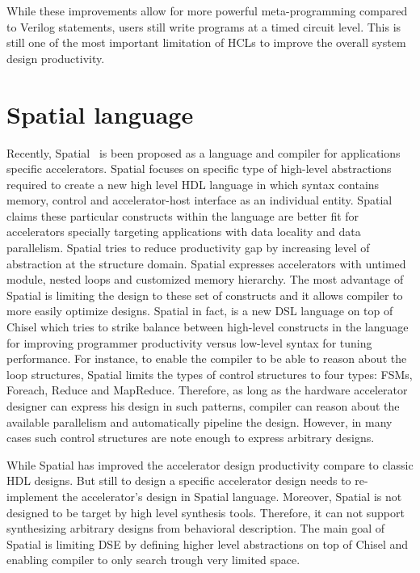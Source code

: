 While these improvements allow for more powerful meta-programming compared to Verilog  statements, users still write programs at a timed circuit level. This is still one of the most important limitation of HCLs to improve the overall system design productivity.

\section{Spatial language}
Recently, Spatial~\cite{david_PLDI_2018_spatial} is been proposed as a language and compiler for applications specific accelerators.
Spatial focuses on specific type of high-level abstractions required to create a new high level HDL language in which syntax contains memory, control and accelerator-host interface as an individual entity.
Spatial claims these particular constructs within the language are better fit for accelerators specially targeting applications with data locality and data parallelism.
Spatial tries to reduce productivity gap by increasing level of abstraction at the structure domain. Spatial expresses accelerators with untimed module, nested loops and customized memory hierarchy.
The most advantage of Spatial is limiting the design to these set of constructs and it allows compiler to more easily optimize designs.
Spatial in fact, is a new DSL language on top of Chisel which tries to strike balance between high-level constructs in the language for improving programmer productivity versus low-level syntax for tuning performance. 
For instance, to enable the compiler to be able to reason about the loop structures, Spatial limits the types of control structures to four types: FSMs, Foreach, Reduce and MapReduce. 
Therefore, as long as the hardware accelerator designer can express his design in such patterns, compiler can reason about the available parallelism and automatically pipeline the design.
However, in many cases such control structures are note enough to express arbitrary designs.

While Spatial has improved the accelerator design productivity compare to classic HDL designs.
But still to design a specific accelerator design needs to re-implement the accelerator's design in Spatial language. Moreover, Spatial is not designed to be target by high level synthesis tools.
Therefore, it can not support synthesizing arbitrary designs from behavioral description.
The main goal of Spatial is limiting DSE by defining higher level abstractions on top of Chisel and enabling compiler to only search trough very limited space.

